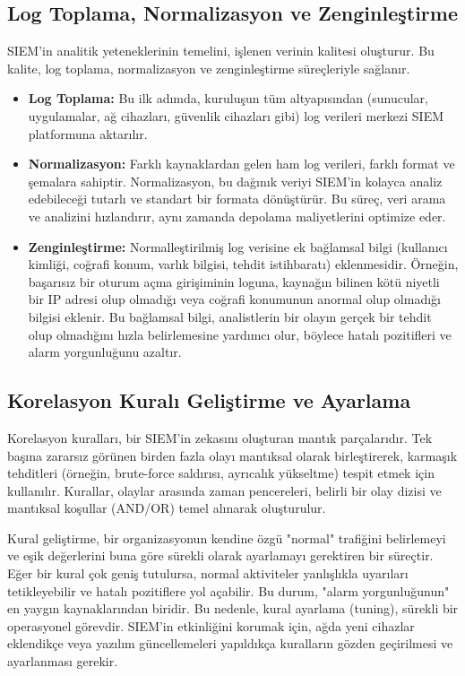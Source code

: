 \subsection{Log Toplama, Normalizasyon ve Zenginleştirme}

SIEM'in analitik yeteneklerinin temelini, işlenen verinin kalitesi oluşturur. Bu kalite, log toplama, normalizasyon ve zenginleştirme süreçleriyle sağlanır.

\begin{itemize}
    \item \textbf{Log Toplama:} Bu ilk adımda, kuruluşun tüm altyapısından (sunucular, uygulamalar, ağ cihazları, güvenlik cihazları gibi) log verileri merkezi SIEM platformuna aktarılır.
    \item \textbf{Normalizasyon:} Farklı kaynaklardan gelen ham log verileri, farklı format ve şemalara sahiptir. Normalizasyon, bu dağınık veriyi SIEM'in kolayca analiz edebileceği tutarlı ve standart bir formata dönüştürür. Bu süreç, veri arama ve analizini hızlandırır, aynı zamanda depolama maliyetlerini optimize eder.
    \item \textbf{Zenginleştirme:} Normalleştirilmiş log verisine ek bağlamsal bilgi (kullanıcı kimliği, coğrafi konum, varlık bilgisi, tehdit istihbaratı) eklenmesidir. Örneğin, başarısız bir oturum açma girişiminin loguna, kaynağın bilinen kötü niyetli bir IP adresi olup olmadığı veya coğrafi konumunun anormal olup olmadığı bilgisi eklenir. Bu bağlamsal bilgi, analistlerin bir olayın gerçek bir tehdit olup olmadığını hızla belirlemesine yardımcı olur, böylece hatalı pozitifleri ve alarm yorgunluğunu azaltır.
\end{itemize}

\subsection{Korelasyon Kuralı Geliştirme ve Ayarlama}

Korelasyon kuralları, bir SIEM'in zekasını oluşturan mantık parçalarıdır. Tek başına zararsız görünen birden fazla olayı mantıksal olarak birleştirerek, karmaşık tehditleri (örneğin, brute-force saldırısı, ayrıcalık yükseltme) tespit etmek için kullanılır. Kurallar, olaylar arasında zaman pencereleri, belirli bir olay dizisi ve mantıksal koşullar (AND/OR) temel alınarak oluşturulur.

Kural geliştirme, bir organizasyonun kendine özgü "normal" trafiğini belirlemeyi ve eşik değerlerini buna göre sürekli olarak ayarlamayı gerektiren bir süreçtir. Eğer bir kural çok geniş tutulursa, normal aktiviteler yanlışlıkla uyarıları tetikleyebilir ve hatalı pozitiflere yol açabilir. Bu durum, "alarm yorgunluğunun" en yaygın kaynaklarından biridir. Bu nedenle, kural ayarlama (tuning), sürekli bir operasyonel görevdir. SIEM'in etkinliğini korumak için, ağda yeni cihazlar eklendikçe veya yazılım güncellemeleri yapıldıkça kuralların gözden geçirilmesi ve ayarlanması gerekir.

